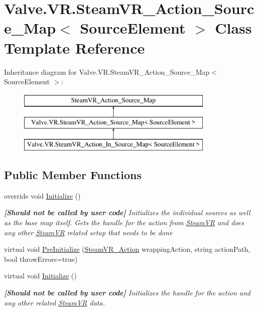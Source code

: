 \hypertarget{class_valve_1_1_v_r_1_1_steam_v_r___action___source___map}{}\section{Valve.\+V\+R.\+Steam\+V\+R\+\_\+\+Action\+\_\+\+Source\+\_\+\+Map$<$ Source\+Element $>$ Class Template Reference}
\label{class_valve_1_1_v_r_1_1_steam_v_r___action___source___map}
Inheritance diagram for Valve.\+V\+R.\+Steam\+V\+R\+\_\+\+Action\+\_\+\+Source\+\_\+\+Map$<$ Source\+Element $>$\+:\begin{figure}[H]
\begin{center}
\leavevmode
\includegraphics[height=3.000000cm]{class_valve_1_1_v_r_1_1_steam_v_r___action___source___map}
\end{center}
\end{figure}
\subsection*{Public Member Functions}
\begin{DoxyCompactItemize}
\item 
override void \mbox{\hyperlink{class_valve_1_1_v_r_1_1_steam_v_r___action___source___map_af035d2609891383f3735ced3cfa1b9ab}{Initialize}} ()
\begin{DoxyCompactList}\small\item\em {\bfseries{\mbox{[}Should not be called by user code\mbox{]}}} Initializes the individual sources as well as the base map itself. Gets the handle for the action from \mbox{\hyperlink{class_valve_1_1_v_r_1_1_steam_v_r}{Steam\+VR}} and does any other \mbox{\hyperlink{class_valve_1_1_v_r_1_1_steam_v_r}{Steam\+VR}} related setup that needs to be done \end{DoxyCompactList}\item 
virtual void \mbox{\hyperlink{class_valve_1_1_v_r_1_1_steam_v_r___action___source___map_a8c5843be007a5e7a7bb2a5ad9a4451d7}{Pre\+Initialize}} (\mbox{\hyperlink{class_valve_1_1_v_r_1_1_steam_v_r___action}{Steam\+V\+R\+\_\+\+Action}} wrapping\+Action, string action\+Path, bool throw\+Errors=true)
\item 
virtual void \mbox{\hyperlink{class_valve_1_1_v_r_1_1_steam_v_r___action___source___map_aa673cb451bc9b3fcc7ce8a7b95d407d6}{Initialize}} ()
\begin{DoxyCompactList}\small\item\em {\bfseries{\mbox{[}Should not be called by user code\mbox{]}}} Initializes the handle for the action and any other related \mbox{\hyperlink{class_valve_1_1_v_r_1_1_steam_v_r}{Steam\+VR}} data. \end{DoxyCompactList}\end{DoxyCompactItemize}
